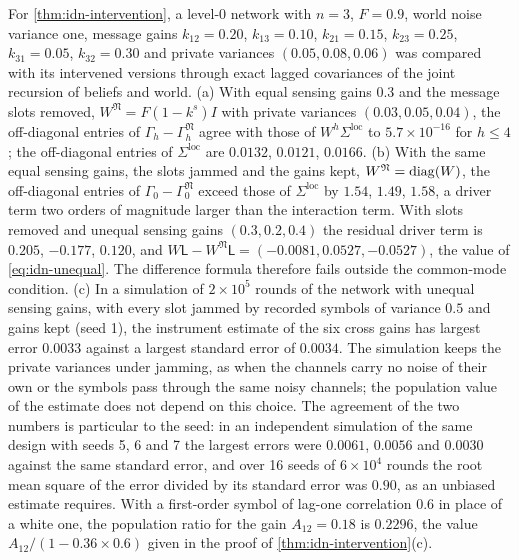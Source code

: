 \begin{numcheck}\label{chk:idn-intervention}
For \cref{thm:idn-intervention}, a level-0 network with $n=3$, $F=0.9$, world noise variance one, message gains $k_{12}=0.20$, $k_{13}=0.10$, $k_{21}=0.15$, $k_{23}=0.25$, $k_{31}=0.05$, $k_{32}=0.30$ and private variances $(0.05,0.08,0.06)$ was compared with its intervened versions through exact lagged covariances of the joint recursion of beliefs and world. (a) With equal sensing gains $0.3$ and the message slots removed, $W^{\mathfrak N}=F(1-k^s)I$ with private variances $(0.03,0.05,0.04)$, the off-diagonal entries of $\Gamma_h-\Gamma_h^{\mathfrak N}$ agree with those of $W^h\Sigma^{\mathrm{loc}}$ to $5.7\times10^{-16}$ for $h\le4$; the off-diagonal entries of $\Sigma^{\mathrm{loc}}$ are $0.0132$, $0.0121$, $0.0166$. (b) With the same equal sensing gains, the slots jammed and the gains kept, $W^{\mathfrak N}=\operatorname{diag}(W)$, the off-diagonal entries of $\Gamma_0-\Gamma_0^{\mathfrak N}$ exceed those of $\Sigma^{\mathrm{loc}}$ by $1.54$, $1.49$, $1.58$, a driver term two orders of magnitude larger than the interaction term. With slots removed and unequal sensing gains $(0.3,0.2,0.4)$ the residual driver term is $0.205$, $-0.177$, $0.120$, and $W\mathsf L-W^{\mathfrak N}\mathsf L=(-0.0081,0.0527,-0.0527)$, the value of \cref{eq:idn-unequal}. The difference formula therefore fails outside the common-mode condition. (c) In a simulation of $2\times10^5$ rounds of the network with unequal sensing gains, with every slot jammed by recorded symbols of variance $0.5$ and gains kept (seed 1), the instrument estimate of the six cross gains has largest error $0.0033$ against a largest standard error of $0.0034$. The simulation keeps the private variances under jamming, as when the channels carry no noise of their own or the symbols pass through the same noisy channels; the population value of the estimate does not depend on this choice. The agreement of the two numbers is particular to the seed: in an independent simulation of the same design with seeds 5, 6 and 7 the largest errors were $0.0061$, $0.0056$ and $0.0030$ against the same standard error, and over 16 seeds of $6\times10^4$ rounds the root mean square of the error divided by its standard error was $0.90$, as an unbiased estimate requires. With a first-order symbol of lag-one correlation $0.6$ in place of a white one, the population ratio for the gain $A_{12}=0.18$ is $0.2296$, the value $A_{12}/(1-0.36\times0.6)$ given in the proof of \cref{thm:idn-intervention}(c).
\end{numcheck}


